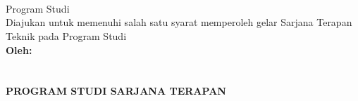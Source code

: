 \begin{titlepage}
    \begin{center}

        \begin{doublespace}
            \textbf{\MakeUppercase{\large{\tipe}}}\\[0.5cm]\textbf{\MakeUppercase{\normalsize{\judulid}}}\\[3cm]
            
        \end{doublespace}
        {\tipe}\\
        Program Studi {\prodi} \\[2cm]
        Diajukan untuk memenuhi salah satu syarat memperoleh gelar Sarjana Terapan Teknik pada Program Studi {\prodi} {\departemen} {\fakultas} {\universitas}\\[3cm]
        

        \textbf{\normalsize {Oleh:}} \\
        \textbf{\normalsize \MakeUppercase{\underline{\penulis}}} \\
        \textbf{\normalsize \MakeUppercase{{\nim}}} \\[3cm]


        \textbf{\normalsize \MakeUppercase{Program Studi Sarjana Terapan\\ \prodi}}\\
        \textbf{\normalsize \MakeUppercase{\departemen}}\\
        \textbf{\normalsize \MakeUppercase{\fakultas}}\\
        \textbf{\normalsize \MakeUppercase{\universitas}}\\
        \textbf{\normalsize \the\year{}}\\
    \end{center}
\end{titlepage}